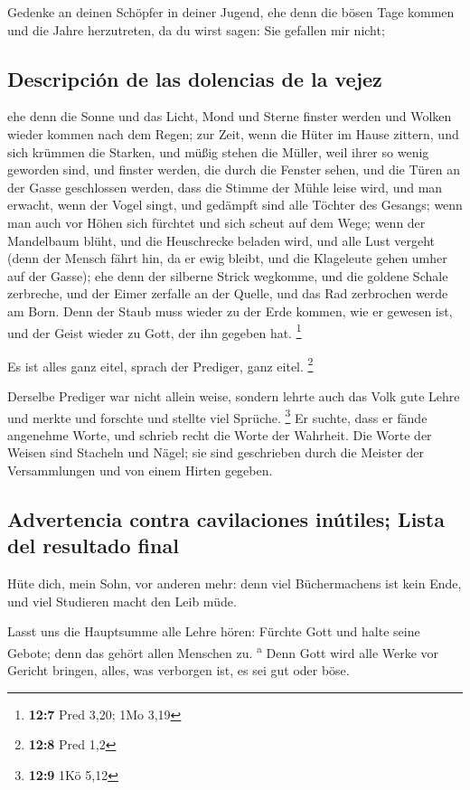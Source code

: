  Gedenke an deinen Schöpfer in deiner Jugend, ehe denn die
bösen Tage kommen und die Jahre herzutreten, da du wirst sagen: Sie
gefallen mir nicht;

\hypertarget{descripciuxf3n-de-las-dolencias-de-la-vejez}{%
\subsection{Descripción de las dolencias de la
vejez}\label{descripciuxf3n-de-las-dolencias-de-la-vejez}}

 ehe denn die Sonne und das Licht, Mond und Sterne finster
werden und Wolken wieder kommen nach dem Regen;  zur Zeit,
wenn die Hüter im Hause zittern, und sich krümmen die Starken, und müßig
stehen die Müller, weil ihrer so wenig geworden sind, und finster
werden, die durch die Fenster sehen,  und die Türen an der
Gasse geschlossen werden, dass die Stimme der Mühle leise wird, und man
erwacht, wenn der Vogel singt, und gedämpft sind alle Töchter des
Gesangs;  wenn man auch vor Höhen sich fürchtet und sich
scheut auf dem Wege; wenn der Mandelbaum blüht, und die Heuschrecke
beladen wird, und alle Lust vergeht (denn der Mensch fährt hin, da er
ewig bleibt, und die Klageleute gehen umher auf der Gasse);
 ehe denn der silberne Strick wegkomme, und die goldene
Schale zerbreche, und der Eimer zerfalle an der Quelle, und das Rad
zerbrochen werde am Born.  Denn der Staub muss wieder zu
der Erde kommen, wie er gewesen ist, und der Geist wieder zu Gott, der
ihn gegeben hat. \footnote{\textbf{12:7} Pred 3,20; 1Mo 3,19}

 Es ist alles ganz eitel, sprach der Prediger, ganz eitel.
\footnote{\textbf{12:8} Pred 1,2}

 Derselbe Prediger war nicht allein weise, sondern lehrte
auch das Volk gute Lehre und merkte und forschte und stellte viel
Sprüche. \footnote{\textbf{12:9} 1Kö 5,12}  Er suchte,
dass er fände angenehme Worte, und schrieb recht die Worte der Wahrheit.
 Die Worte der Weisen sind Stacheln und Nägel; sie sind
geschrieben durch die Meister der Versammlungen und von einem Hirten
gegeben.

\hypertarget{advertencia-contra-cavilaciones-inuxfatiles-lista-del-resultado-final}{%
\subsection{Advertencia contra cavilaciones inútiles; Lista del
resultado
final}\label{advertencia-contra-cavilaciones-inuxfatiles-lista-del-resultado-final}}

 Hüte dich, mein Sohn, vor anderen mehr: denn viel
Büchermachens ist kein Ende, und viel Studieren macht den Leib müde.

 Lasst uns die Hauptsumme alle Lehre hören: Fürchte Gott
und halte seine Gebote; denn das gehört allen Menschen zu.
\textsuperscript{a}  Denn Gott wird alle Werke vor
Gericht bringen, alles, was verborgen ist, es sei gut oder böse.
